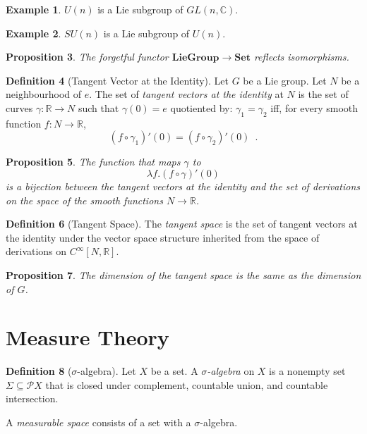 \documentclass{book}
\newtheorem{prop}{Proposition}[chapter]
\theoremstyle{definition}
\newtheorem{df}[prop]{Definition}
\newtheorem{ex}[prop]{Example}
\newcommand{\Set}{\ensuremath{\mathbf{Set}}}
\begin{document}
\begin{ex}
$U(n)$ is a Lie subgroup of $GL(n,\mathbb{C})$.
\end{ex}

\begin{ex}
$SU(n)$ is a Lie subgroup of $U(n)$.
\end{ex}

\begin{prop}
The forgetful functor $\mathbf{LieGroup} \rightarrow \Set$ reflects isomorphisms.
\end{prop}


\begin{df}[Tangent Vector at the Identity]
Let $G$ be a Lie group. Let $N$ be a neighbourhood of $e$. The set of \emph{tangent vectors at the identity} at $N$ is the set of curves $\gamma : \mathbb{R} \rightarrow N$ such that $\gamma(0) = e$ quotiented by: $\gamma_1 = \gamma_2$ iff, for every smooth function $f : N \rightarrow \mathbb{R}$,
\[ (f \circ \gamma_1)'(0) = (f \circ \gamma_2)'(0) \enspace . \]
\end{df}

\begin{prop}
The function that maps $\gamma$ to
\[ \lambda f. (f \circ \gamma)'(0) \]
 is a bijection between the tangent vectors at the identity and the set of derivations on the space of the smooth functions $N \rightarrow \mathbb{R}$.
 \end{prop}
 
 
\begin{df}[Tangent Space]
The \emph{tangent space} is the set of tangent vectors at the identity under the vector space structure inherited from the space of derivations on $C^\infty[N, \mathbb{R}]$.
\end{df}

\begin{prop}
The dimension of the tangent space is the same as the dimension of $G$.
\end{prop}



\part{Measure Theory}

\begin{df}[$\sigma$-algebra]
Let $X$ be a set. A \emph{$\sigma$-algebra} on $X$ is a nonempty set $\Sigma \subseteq \mathcal{P} X$ that is closed under complement, countable union, and countable intersection.

A \emph{measurable space} consists of a set with a $\sigma$-algebra.
\end{df}
\end{document}
